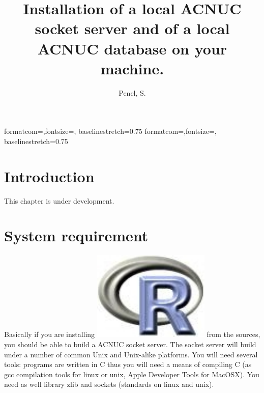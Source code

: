 \documentclass{article}
\title{Installation of a local ACNUC socket server and of a local ACNUC database on your machine.}
\author{Penel, S.}
\begin{document}

%
%
{formatcom={\color{Sinput}},fontsize=\footnotesize, baselinestretch=0.75}
{formatcom={\color{Soutput}},fontsize=\footnotesize, baselinestretch=0.75}
%
%
\renewenvironment{Schunk}{\vspace{\topsep}}{\vspace{\topsep}}
%
%
\newcommand{\Rlogo}{\protect\includegraphics[height=1.8ex,keepaspectratio]{../figs/Rlogo.pdf}}
%
%
\newcommand{\seqinr}{\texttt{seqin\bf{R}}}
\newcommand{\Seqinr}{\texttt{Seqin\bf{R}}}
%
%
%
%
%


\maketitle
\tableofcontents



\section{Introduction}

This chapter is under development.

\section{System requirement}

Basically if you are installing \Rlogo{} from the
sources, you should be able to build a ACNUC socket server.
The socket server will build under a number of common Unix and Unix-alike
platforms. You will need several tools: programs are written in C thus 
you will need a
means of compiling C (as gcc compilation tools for linux or unix, Apple
Developer Tools  for MacOSX). You need as well library zlib and sockets
(standards on linux and unix).
\end{document}
